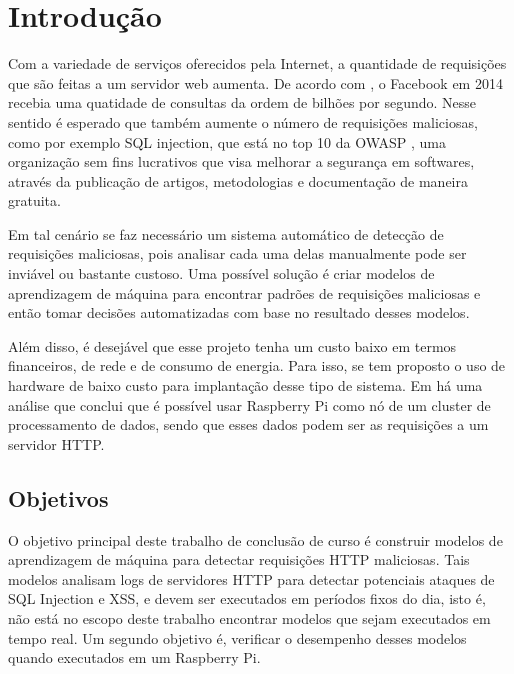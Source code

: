 
\chapter{Introdução}
\label{cap:introducao}

Com a variedade de serviços oferecidos pela Internet, a quantidade de requisições
que são feitas a um servidor web aumenta. De acordo com \cite{facebook:topProblems}, o Facebook em 2014 recebia
uma quatidade de consultas da ordem de bilhões por segundo. Nesse sentido é esperado que
também aumente o número de requisições maliciosas, como por exemplo SQL injection, que está 
no top 10 da OWASP \cite{owasp:top10}, uma organização sem fins lucrativos que visa melhorar a segurança em 
softwares, através da publicação de artigos, metodologias e documentação de maneira gratuita.

Em tal cenário se faz necessário um sistema automático de detecção de requisições maliciosas, pois analisar cada
uma delas manualmente pode ser inviável ou bastante custoso. Uma possível solução é criar modelos de aprendizagem
de máquina para encontrar padrões de requisições maliciosas e então tomar decisões automatizadas com base no
resultado desses modelos.

Além disso, é desejável que esse projeto tenha um custo baixo em termos financeiros, de rede e
de consumo de energia. Para isso, se tem proposto o uso de hardware de baixo custo para implantação 
desse tipo de sistema. Em \cite{sbrc_estendido:lucas} há uma análise que conclui que é possível usar Raspberry Pi como nó de
um cluster de processamento de dados, sendo que esses dados podem ser as requisições a um servidor HTTP.

\section{Objetivos}

O objetivo principal deste trabalho de conclusão de curso é construir modelos de aprendizagem de máquina para 
detectar requisições HTTP maliciosas. Tais modelos analisam logs de servidores HTTP para detectar 
potenciais ataques de SQL Injection e XSS, e devem ser executados em períodos fixos do dia, isto é, 
não está no escopo deste trabalho encontrar modelos que sejam executados em tempo real. Um segundo objetivo é, 
verificar o desempenho desses modelos quando executados em um Raspberry Pi. 

